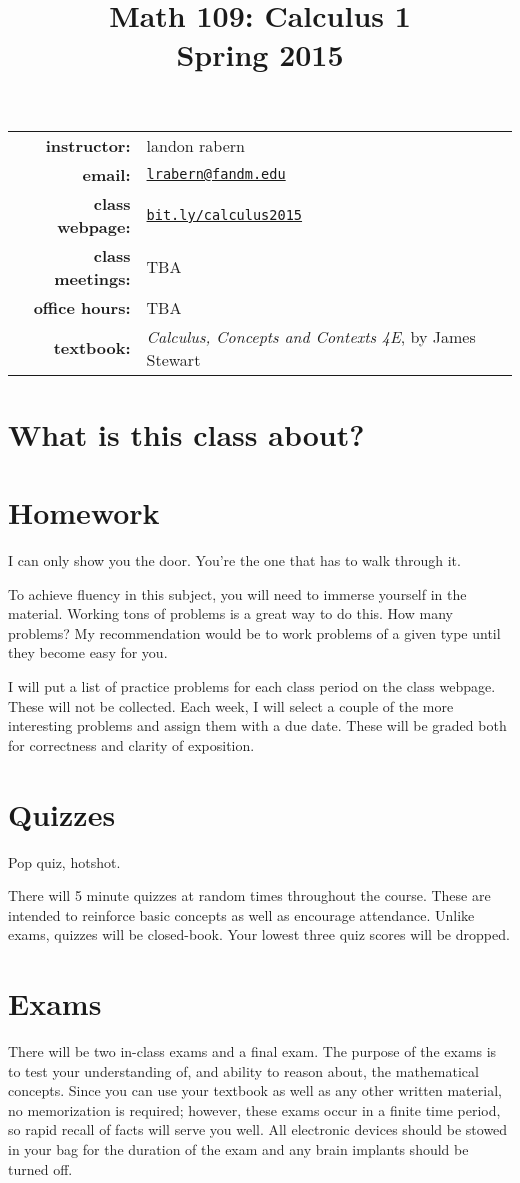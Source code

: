\documentclass[12pt]{article}
\title{Math 109: Calculus 1\\ \bigskip\small{Spring 2015}}
\date{}
\begin{document}
\maketitle

\begin{tabular}{r l}
\textbf{instructor:}& landon rabern\\
\textbf{email:}& \href{mailto:lrabern@fandm.edu}{\nolinkurl{lrabern@fandm.edu}}\\
\textbf{class webpage:}& \href{http://bit.ly/calculus2015}{\nolinkurl{bit.ly/calculus2015}}\\
\textbf{class meetings:}& TBA\\
\textbf{office hours:}& TBA\\
\textbf{textbook:}& \textit{Calculus, Concepts and Contexts 4E}, by James Stewart\\
\end{tabular}

\section*{What is this class about?}

\section*{Homework}
\epigraph{I can only show you the door. You're the one that has to walk through it.}{}
To achieve fluency in this subject, you will need to immerse yourself in the material.  
Working tons of problems is a great way to do this.  How many problems?  
My recommendation would be to work problems of a given type until they become easy for you.

I will put a list of practice problems for each class period on the class webpage.  These will not be collected.  
Each week, I will select a couple of the more interesting problems and assign them with a due date.  
These will be graded both for correctness and clarity of exposition.

\section*{Quizzes}
\epigraph{Pop quiz, hotshot.}{}
There will 5 minute quizzes at random times throughout the course.  
These are intended to reinforce basic concepts as well as encourage attendance.
Unlike exams, quizzes will be closed-book.  Your lowest three quiz scores will be dropped.

\section*{Exams}
There will be two in-class exams and a final exam. 
The purpose of the exams is to test your understanding of, and ability to reason about, the mathematical concepts. Since you can use your textbook as well as any other written material, no memorization is required; however, these exams occur in a finite time period, so rapid recall of facts will serve you well.  All electronic devices should be stowed in your bag for the duration of the exam and any brain implants should be turned off.
\end{document}
